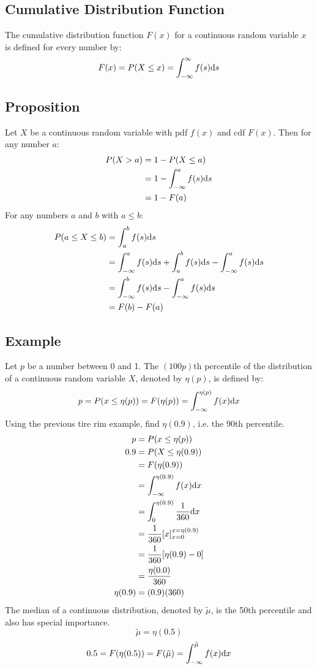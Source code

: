 \documentclass[letterpaper, 12pt]{math}
\begin{document}
\subsection*{Cumulative Distribution Function}
The cumulative distribution function \( F(x) \) for a continuous random variable
\( x \) is defined for every number by:
\[ F(x) = P(X\leq x) = \int_{-\infty}^{\infty}f(s)\mathrm{d}{s} \]

\subsection*{Proposition}
Let \( X \) be a continuous random variable with pdf \( f(x) \) and cdf
\( F(x) \). Then for any number \( a \):
\begin{align*}
  P(X>a) &= 1-P(X\leq a) \\
  &= 1-\int_{-\infty}^{a}f(s)\mathrm{d}{s} \\
  &= 1-F(a)
\end{align*}
For any numbers \( a \) and \( b \) with \( a \leq b \):
\begin{align*}
  P(a\leq X\leq b) &= \int_{a}^{b}f(s)\mathrm{d}{s} \\
  &= \int_{-\infty}^{a}f(s)\mathrm{d}{s}+\int_{a}^{b}f(s)\mathrm{d}{s}-
    \int_{-\infty}^{a}f(s)\mathrm{d}{s} \\
  &= \int_{-\infty}^{b}f(s)\mathrm{d}{s}-\int_{-\infty}^{a}f(s)\mathrm{d}{s} \\
  &= F(b)-F(a)
\end{align*}

\subsection*{Example}
Let \( p \) be a number between 0 and 1. The \( (100p) \)th percentile of the
distribution of a continuous random variable \( X \), denoted by \( \eta(p) \),
is defined by:
\[ p = P(x\leq\eta(p)) = F(\eta(p)) = \int_{-\infty}^{\eta(p)}f(x)\mathrm{d}{x} \]
Using the previous tire rim example, find \( \eta(0.9) \), i.e. the 90th
percentile.
\begin{align*}
  p &= P(x\leq\eta(p)) \\
  0.9 &= P(X\leq\eta(0.9)) \\
  &= F(\eta(0.9)) \\
  &= \int_{-\infty}^{\eta(0.9)}f(x)\mathrm{d}{x} \\
  &= \int_{0}^{\eta(0.9)}\frac{1}{360}\mathrm{d}{x} \\
  &= \frac{1}{360}[x]_{x=0}^{x=\eta(0.9)} \\
  &= \frac{1}{360}[\eta(0.9)-0] \\
  &= \frac{\eta(0.0)}{360} \\
  \eta(0.9) &= (0.9)(360)
\end{align*}
The median of a continuous distribution, denoted by \( \tilde{\mu} \), is
the 50th percentile and also has special importance.
\[ \tilde{\mu} = \eta(0.5) \]
\[ 0.5 = F(\eta(0.5)) = F(\tilde{\mu}) =
   \int_{-\infty}^{\tilde{\mu}}f(x)\mathrm{d}{x} \]
\end{document}
